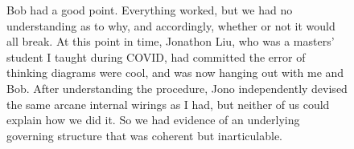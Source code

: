 \begin{figure}[h!]
\centering
{}
\end{figure}

\begin{figure}[h!]
\centering
{}
\end{figure}

\begin{figure}[h!]
\centering
{}
\caption{Bob had a good point. Everything worked, but we had no understanding as to why, and accordingly, whether or not it would all break. At this point in time, Jonathon Liu, who was a masters' student I taught during COVID, had committed the error of thinking diagrams were cool, and was now hanging out with me and Bob. After understanding the procedure, Jono independently devised the same arcane internal wirings as I had, but neither of us could explain how we did it. So we had evidence of an underlying governing structure that was coherent but inarticulable.}
\end{figure}

